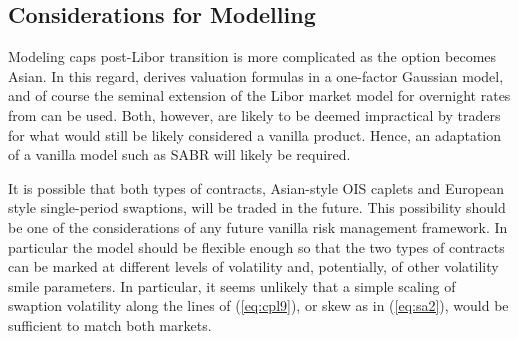 \documentclass{article}
\begin{document}
\subsection{Considerations for Modelling}

Modeling caps post-Libor transition is more complicated as the option
becomes Asian. In this regard, \cite{henrard-ssrn1} derives valuation
formulas in a one-factor Gaussian model, and of course the seminal extension
of the Libor market model for overnight rates from \cite{lyas-merc-l} can be
used. Both, however, are likely to be deemed impractical by traders for what
would still be likely considered a vanilla product. Hence, an adaptation of
a vanilla model such as SABR will likely be required.

It is possible that both types of contracts, Asian-style OIS caplets and
European style single-period swaptions, will be traded in the future. This
possibility should be one of the considerations of any future vanilla risk
management framework. In particular the model should be flexible enough so
that the two types of contracts can be marked at different levels of
volatility and, potentially, of other volatility smile parameters. In
particular, it seems unlikely that a simple scaling of swaption volatility
along the lines of (\ref{eq:cpl9}), or skew as in (\ref{eq:sa2}), would be
sufficient to match both markets.
\end{document}
